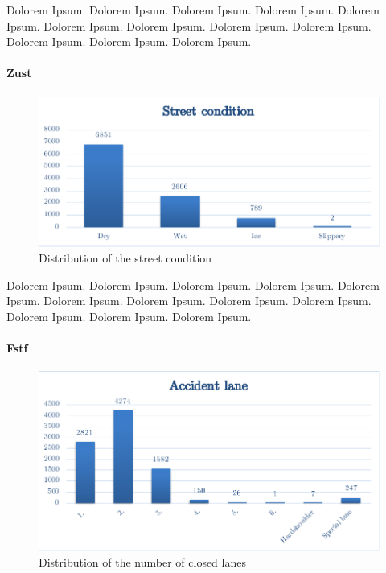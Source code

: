 \documentclass[a4paper,12pt]{report}
\begin{document}
Dolorem Ipsum. Dolorem Ipsum. Dolorem Ipsum. Dolorem Ipsum.
Dolorem Ipsum. Dolorem Ipsum. Dolorem Ipsum. Dolorem Ipsum.
Dolorem Ipsum. Dolorem Ipsum. Dolorem Ipsum. Dolorem Ipsum.

\paragraph{Zust}
\begin{figure}[h]
	\centering
	\includegraphics[scale=0.6]{./assets/baysis_dataset_Zust}
	\caption{Distribution of the street condition}
	\label{img:baysis_dataset_Zust}
\end{figure}

Dolorem Ipsum. Dolorem Ipsum. Dolorem Ipsum. Dolorem Ipsum.
Dolorem Ipsum. Dolorem Ipsum. Dolorem Ipsum. Dolorem Ipsum.
Dolorem Ipsum. Dolorem Ipsum. Dolorem Ipsum. Dolorem Ipsum.

\paragraph{Fstf}
\begin{figure}[H]
	\centering
	\includegraphics[scale=0.6]{./assets/baysis_dataset_Fstf.pdf}
	\caption{Distribution of the number of closed lanes}
	\label{img:baysis_dataset_Fstf}
\end{figure}
\end{document}

